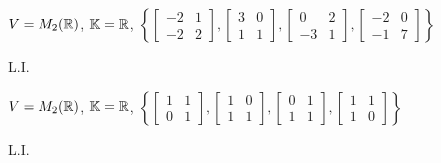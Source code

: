 \documentclass[12pt]{exam}
\begin{document}
    \begin{exercicio}
        $V = M_2(\mathbb{R})$, $\mathbb{K} = \mathbb{R}$,
        $
            \left\{
                \begin{bmatrix}
                    -2 & 1\\
                    -2 & 2
                \end{bmatrix},
                \begin{bmatrix}
                    3 & 0\\
                    1 & 1
                \end{bmatrix},
                \begin{bmatrix}
                    0 & 2\\
                    -3 & 1
                \end{bmatrix},
                \begin{bmatrix}
                    -2 & 0\\
                    -1 & 7
                \end{bmatrix}
            \right\}
        $
        \begin{solucao}
            L.I.
        \end{solucao}
    \end{exercicio}

    \begin{exercicio}
        $V = M_2(\mathbb{R})$, $\mathbb{K} = \mathbb{R}$,
        $
            \left\{
                \begin{bmatrix}
                    1 & 1\\
                    0 & 1
                \end{bmatrix},
                \begin{bmatrix}
                    1 & 0\\
                    1 & 1
                \end{bmatrix},
                \begin{bmatrix}
                    0 & 1\\
                    1 & 1
                \end{bmatrix},
                \begin{bmatrix}
                    1 & 1\\
                    1 & 0
                \end{bmatrix}
            \right\}
        $
        \begin{solucao}
            L.I.
        \end{solucao}
    \end{exercicio}
\end{document}
